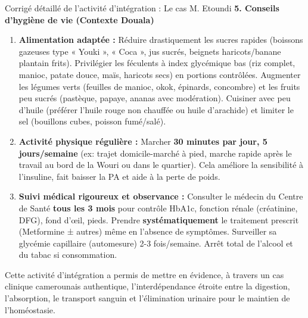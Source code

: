 \documentclass[11pt]{article}
\newcounter{popsec}
\newcounter{popsub}
\newcommand{\courssub}[1]{%
  \stepcounter{popsub}%
  \par\vspace{9pt}\noindent{\popxbold\fontsize{11.5}{13}\selectfont\color{popink}{\color{poporange}\thepopsec.\thepopsub}\hspace{6pt}#1}\par\nopagebreak\vspace{4pt}
}
\begin{document}
\begin{exoresolu}{Corrigé détaillé de l'activité d'intégration : Le cas M. Etoundi}
\textbf{5. Conseils d'hygiène de vie (Contexte Douala)}
\begin{enumerate}
    \item \textbf{Alimentation adaptée :} Réduire drastiquement les sucres rapides (boissons gazeuses type « Youki », « Coca », jus sucrés, beignets haricots/banane plantain frits). Privilégier les féculents à index glycémique bas (riz complet, manioc, patate douce, maïs, haricots secs) en portions contrôlées. Augmenter les légumes verts (feuilles de manioc, okok, épinards, concombre) et les fruits peu sucrés (pastèque, papaye, ananas avec modération). Cuisiner avec peu d'huile (préférer l'huile rouge non chauffée ou huile d'arachide) et limiter le sel (bouillons cubes, poisson fumé/salé).
    \item \textbf{Activité physique régulière :} Marcher \textbf{30 minutes par jour, 5 jours/semaine} (ex: trajet domicile-marché à pied, marche rapide après le travail au bord de la Wouri ou dans le quartier). Cela améliore la sensibilité à l'insuline, fait baisser la PA et aide à la perte de poids.
    \item \textbf{Suivi médical rigoureux et observance :} Consulter le médecin du Centre de Santé \textbf{tous les 3 mois} pour contrôle HbA1c, fonction rénale (créatinine, DFG), fond d'œil, pieds. Prendre \textbf{systématiquement} le traitement prescrit (Metformine ± autres) même en l'absence de symptômes. Surveiller sa glycémie capillaire (automesure) 2-3 fois/semaine. Arrêt total de l'alcool et du tabac si consommation.
\end{enumerate}
\end{exoresolu}

\courssub{Bilan de l'activité}
Cette activité d'intégration a permis de mettre en évidence, à travers un cas clinique camerounais authentique, l'interdépendance étroite entre la digestion, l'absorption, le transport sanguin et l'élimination urinaire pour le maintien de l'homéostasie.
\end{document}
